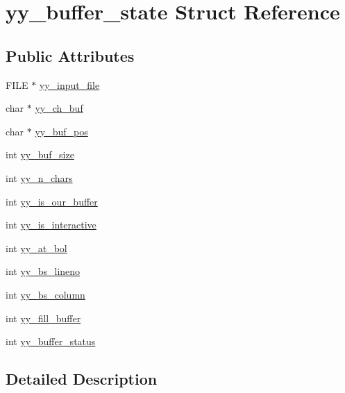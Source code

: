 \hypertarget{structyy__buffer__state}{\section{yy\-\_\-buffer\-\_\-state Struct Reference}
\label{structyy__buffer__state}
}
\subsection*{Public Attributes}
\begin{DoxyCompactItemize}
\item 
F\-I\-L\-E $\ast$ \hyperlink{structyy__buffer__state_a4843d1422e3276b636d475a3095bd948}{yy\-\_\-input\-\_\-file}
\item 
char $\ast$ \hyperlink{structyy__buffer__state_ad7b8df8d8a4688e57b0b8d3ca75adc85}{yy\-\_\-ch\-\_\-buf}
\item 
char $\ast$ \hyperlink{structyy__buffer__state_a58aa927f098b99d99e75da80f9b681ef}{yy\-\_\-buf\-\_\-pos}
\item 
int \hyperlink{structyy__buffer__state_a451d39697f006f3922c1f43cf79286b4}{yy\-\_\-buf\-\_\-size}
\item 
int \hyperlink{structyy__buffer__state_a06406208824817acfec2183b79080945}{yy\-\_\-n\-\_\-chars}
\item 
int \hyperlink{structyy__buffer__state_a80ce2431c70dc4f89ced487f18449465}{yy\-\_\-is\-\_\-our\-\_\-buffer}
\item 
int \hyperlink{structyy__buffer__state_abf5c70eea75581b58c0ee7bd31b14490}{yy\-\_\-is\-\_\-interactive}
\item 
int \hyperlink{structyy__buffer__state_a9d60c60af6e1a6f69de16871fd64f85f}{yy\-\_\-at\-\_\-bol}
\item 
int \hyperlink{structyy__buffer__state_a818e94bc9c766e683c60df1e9fd01199}{yy\-\_\-bs\-\_\-lineno}
\item 
int \hyperlink{structyy__buffer__state_a10c4fcd8be759e6bf11e6d3e8cdb0307}{yy\-\_\-bs\-\_\-column}
\item 
int \hyperlink{structyy__buffer__state_a63d2afbb1d79a3fc63df9e12626f827d}{yy\-\_\-fill\-\_\-buffer}
\item 
int \hyperlink{structyy__buffer__state_a70fd925d37a2f0454fbd0def675d106c}{yy\-\_\-buffer\-\_\-status}
\end{DoxyCompactItemize}


\subsection{Detailed Description}


